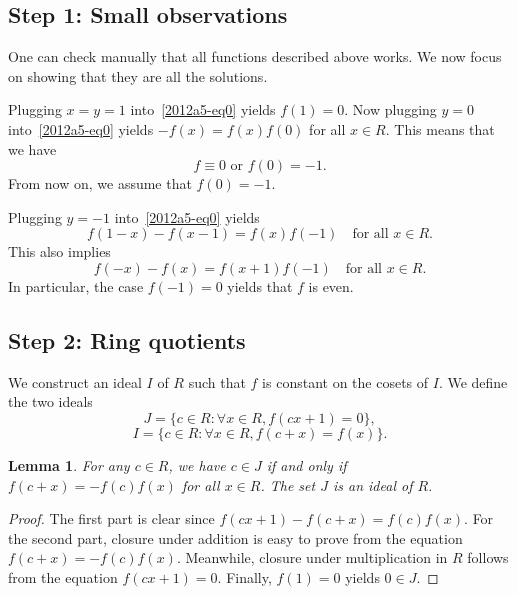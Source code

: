 \documentclass{article}
\newtheorem{lemma}{Lemma}
\begin{document}
\subsection*{Step 1: Small observations}

One can check manually that all functions described above works.
We now focus on showing that they are all the solutions.

Plugging $x = y = 1$ into~\eqref{2012a5-eq0} yields $f(1) = 0$.
Now plugging $y = 0$ into~\eqref{2012a5-eq0} yields $-f(x) = f(x) f(0)$ for all $x \in R$.
This means that we have
\[ f \equiv 0 \text{ or } f(0) = -1. \tag{1.1}\label{2012a5-eq1-1} \]
From now on, we assume that $f(0) = -1$.

Plugging $y = -1$ into~\eqref{2012a5-eq0} yields
\[ f(1 - x) - f(x - 1) = f(x) f(-1) \quad \text{for all } x \in R. \tag{1.2}\label{2012a5-eq1-2} \]
This also implies
\[ f(-x) - f(x) = f(x + 1) f(-1) \quad \text{for all } x \in R. \tag{1.3}\label{2012a5-eq1-3} \]
In particular, the case $f(-1) = 0$ yields that $f$ is even.









\subsection*{Step 2: Ring quotients}

We construct an ideal $I$ of $R$ such that $f$ is constant on the cosets of $I$.
We define the two ideals
\[ J = \{c \in R : \forall x \in R, f(cx + 1) = 0\}, \tag{2.1}\label{2012a5-eq2-1} \]
\[ I = \{c \in R : \forall x \in R, f(c + x) = f(x)\}. \tag{2.2}\label{2012a5-eq2-2} \]

\begin{lemma}\label{2012a5-2-1}
For any $c \in R$, we have $c \in J$ if and only if $f(c + x) = -f(c) f(x)$ for all $x \in R$.
The set $J$ is an ideal of $R$.
\end{lemma}
\begin{proof}
The first part is clear since $f(cx + 1) - f(c + x) = f(c) f(x)$.
For the second part, closure under addition is easy to prove from the equation $f(c + x) = -f(c) f(x)$.
Meanwhile, closure under multiplication in $R$ follows from the equation $f(cx + 1) = 0$.
Finally, $f(1) = 0$ yields $0 \in J$.
\end{proof}
\end{document}
